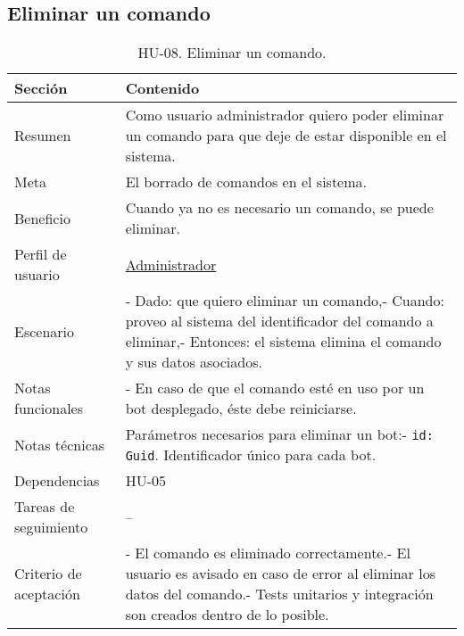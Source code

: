 \subsection{Eliminar un comando}

\begin{table}[H]
    \centering
    \def\arraystretch{1.25}
    \begin{adjustbox}{max width=\textwidth}
    \begin{tabularx}{\textwidth}{l|L}
    \hline
        \textbf{Sección} & \textbf{Contenido} \\ \hline
    \hline
        Resumen & Como usuario administrador quiero poder eliminar un comando para que deje de estar disponible en el sistema. \\ \hline
        Meta & El borrado de comandos en el sistema. \\ \hline
        Beneficio & Cuando ya no es necesario un comando, se puede eliminar. \\ \hline
        Perfil de usuario & \hyperref[sec:personaAdmin]{Administrador} \\ \hline
        Escenario & - Dado: que quiero eliminar un comando,\linebreak - Cuando: proveo al sistema del identificador del comando a eliminar,\linebreak - Entonces: el sistema elimina el comando y sus datos asociados. \\ \hline
        Notas funcionales & - En caso de que el comando esté en uso por un bot desplegado, éste debe reiniciarse. \\ \hline
        Notas técnicas & Parámetros necesarios para eliminar un bot:\linebreak - \verb|id: Guid|. Identificador único para cada bot. \\ \hline
        Dependencias & HU-05 \\ \hline
        Tareas de seguimiento & – \\ \hline
        Criterio de aceptación & - El comando es eliminado correctamente.\linebreak - El usuario es avisado en caso de error al eliminar los datos del comando.\linebreak - Tests unitarios y integración son creados dentro de lo posible. \\ \hline
    \end{tabularx}
    \end{adjustbox}
    \caption{HU-08. Eliminar un comando.}
\end{table}

